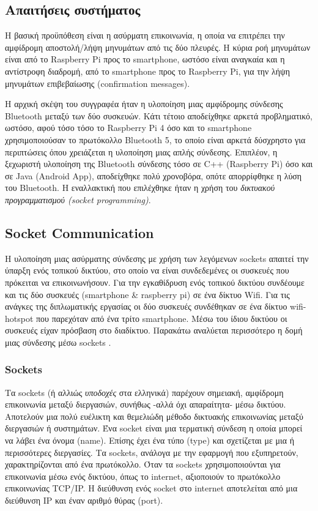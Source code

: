 \subsection{Απαιτήσεις συστήματος}
Η βασική προϋπόθεση είναι η ασύρματη επικοινωνία, η οποία να επιτρέπει την αμφίδρομη αποστολή/λήψη μηνυμάτων από τις δύο πλευρές. Η κύρια ροή μηνυμάτων είναι από το Raspberry Pi προς το smartphone, ωστόσο είναι αναγκαία και η αντίστροφη διαδρομή, από το smartphone προς το Raspberry Pi, για την λήψη μηνυμάτων επιβεβαίωσης (confirmation messages).

Η αρχική σκέψη του συγγραφέα ήταν η υλοποίηση μιας αμφίδρομης σύνδεσης Bluetooth μεταξύ των δύο συσκευών. Κάτι τέτοιο αποδείχθηκε αρκετά προβληματικό, ωστόσο, αφού τόσο τόσο το Raspberry Pi 4 όσο και το smartphone χρησιμοποιούσαν το πρωτόκολλο Bluetooth 5, το οποίο είναι αρκετά δύσχρηστο για περιπτώσεις όπου χρειάζεται η υλοποίηση μιας απλής σύνδεσης. Επιπλέον, η ξεχωριστή υλοποίηση της Bluetooth σύνδεσης τόσο σε C++ (Raspberry Pi) όσο και σε Java (Android App), αποδείχθηκε πολύ χρονοβόρα, οπότε απορρίφθηκε η λύση του Bluetooth. Η εναλλακτική που επιλέχθηκε ήταν η χρήση του \emph{δικτυακού προγραμματισμού (socket programming)}.

\subsection{Socket Communication}
Η υλοποίηση μιας ασύρματης σύνδεσης με χρήση των λεγόμενων sockets απαιτεί την ύπαρξη ενός τοπικού δικτύου, στο οποίο να είναι συνδεδεμένες οι συσκευές που πρόκειται να επικοινωνήσουν. Για την εγκαθίδρυση ενός τοπικού δικτύου συνδέουμε και τις δύο συσκευές (smartphone \& raspberry pi) σε ένα δίκτυο Wifi. Για τις ανάγκες της διπλωματικής εργασίας οι δύο συσκευές συνδέθηκαν σε ένα δίκτυο wifi-hotspot που παρεχόταν από ένα τρίτο smartphone. Μέσω του ίδιου δικτύου οι συσκευές είχαν πρόσβαση στο διαδίκτυο. Παρακάτω αναλύεται περισσότερο η δομή μιας σύνδεσης μέσω sockets \cite{wiki:sockets}.

\subsubsection{Sockets}
Τα sockets (ή αλλιώς \emph{υποδοχές} στα ελληνικά) παρέχουν σημειακή, αμφίδρομη επικοινωνία μεταξύ διεργασιών, συνήθως -αλλά όχι απαραίτητα- μέσω δικτύου. Αποτελούν μια πολύ ευέλικτη και θεμελιώδη μέθοδο δικτυακής επικοινωνίας μεταξύ διεργασιών ή συστημάτων. Ένα socket είναι μια τερματική σύνδεση η οποία μπορεί να λάβει ένα όνομα (name). Επίσης έχει ένα τύπο (type) και σχετίζεται με μια ή περισσότερες διεργασίες. Τα sockets, ανάλογα με την εφαρμογή που εξυπηρετούν, χαρακτηρίζονται από ένα πρωτόκολλο. Όταν τα sockets χρησιμοποιούνται για επικοινωνία μέσω ενός δικτύου, όπως το internet, αξιοποιούν το πρωτόκολλο επικοινωνίας TCP/IP. Η διεύθυνση ενός socket στο internet αποτελείται από μια διεύθυνση IP και έναν αριθμό θύρας (port).

